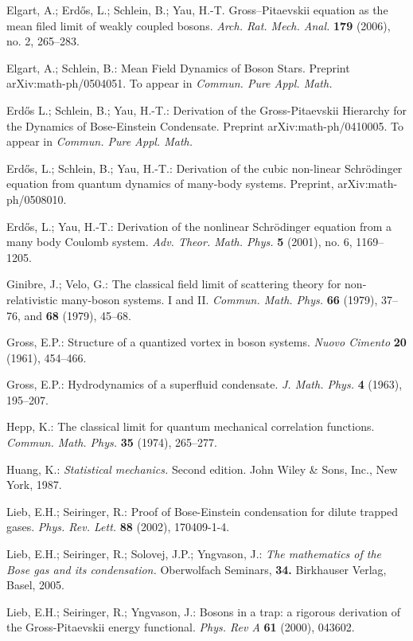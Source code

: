 \documentclass[11pt]{article}
\begin{document}
 Elgart, A.; Erd{\H{o}}s, L.; Schlein, B.; Yau, H.-T.
 {G}ross--{P}itaevskii equation as the mean filed limit of weakly
coupled bosons. \textit{Arch. Rat. Mech. Anal.} \textbf{179} (2006),
no. 2, 265--283.

 Elgart, A.; Schlein, B.:
 Mean Field Dynamics of Boson Stars.
Preprint arXiv:math-ph/0504051.
To appear in
\textit{Commun. Pure Appl. Math.}

Erd{\H{o}}s L.; Schlein, B.; Yau, H.-T.:  Derivation of the
{G}ross-{P}itaevskii Hierarchy for the Dynamics of {B}ose-{E}instein
Condensate. Preprint arXiv:math-ph/0410005. To appear in
\textit{Commun. Pure Appl. Math.}

 Erd{\H{o}}s, L.; Schlein, B.; Yau, H.-T.:
Derivation of the cubic non-linear Schr\"odinger equation from
quantum dynamics of many-body systems. Preprint,
arXiv:math-ph/0508010.

 Erd{\H{o}}s, L.; Yau, H.-T.: Derivation
of the nonlinear {S}chr\"odinger equation from a many body {C}oulomb
system. \textit{Adv. Theor. Math. Phys.} \textbf{5} (2001), no. 6,
1169--1205.

 Ginibre, J.; Velo, G.: The classical
field limit of scattering theory for non-relativistic many-boson
systems. I and II. \textit{Commun. Math. Phys.} \textbf{66} (1979),
37--76, and \textbf{68} (1979), 45--68.

 Gross, E.P.: Structure of a quantized vortex in boson
systems. \textit{Nuovo Cimento} \textbf{20} (1961), 454--466.

 Gross, E.P.: Hydrodynamics of a superfluid condensate.
\textit{J. Math. Phys.} \textbf{4} (1963), 195--207.

 Hepp, K.: The classical limit for quantum mechanical
correlation functions. \textit{Commun. Math. Phys.} \textbf{35}
(1974), 265--277.

Huang, K.: \textit{Statistical mechanics.} Second edition. John Wiley
\& Sons, Inc., New York, 1987.


 Lieb, E.H.; Seiringer, R.:
Proof of {B}ose-{E}instein condensation for dilute trapped gases.
\textit{Phys. Rev. Lett.} \textbf{88} (2002), 170409-1-4.


 Lieb, E.H.; Seiringer, R.; Solovej, J.P.; Yngvason, J.:
{\sl The mathematics of the Bose gas and its condensation. }
Oberwolfach Seminars, {\bf 34.}
Birkhauser Verlag, Basel, 2005.

 Lieb, E.H.; Seiringer, R.; Yngvason, J.: Bosons in a trap:
a rigorous derivation of the {G}ross-{P}itaevskii energy functional.
\textit{Phys. Rev A} \textbf{61} (2000), 043602.
\end{document}
